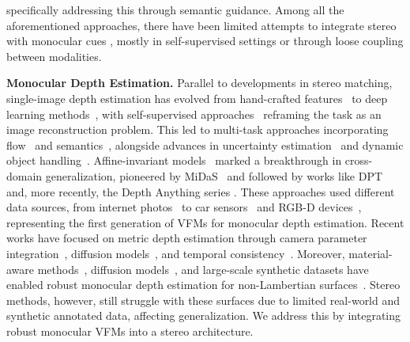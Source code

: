 \documentclass[10pt,twocolumn,letterpaper]{article}
\begin{document}
\cite{costanzino2023learning} specifically addressing this through semantic guidance. Among all the aforementioned approaches, there have been limited attempts to integrate stereo with monocular cues \cite{Chen_2021_ICCV, aleotti2020reversing, watson2020learning}, mostly in self-supervised settings or through loose coupling between modalities.

    \textbf{Monocular Depth Estimation.} Parallel to developments in stereo matching, single-image depth estimation has evolved from hand-crafted features~\cite{Saxena2008} to deep learning methods~\cite{chen2016single, eigen2014depth, laina2016deeper, Ramamonjisoa_2020_CVPR, wang2020cliffnet}, with self-supervised approaches~\cite{godard2017unsupervised, zhou2017unsupervised, mahjourian2018unsupervised, godard2019monodepth2, poggi2018learning, watson2019depthhints, zhao2022monovit}  reframing the task as an image reconstruction problem. This led to multi-task approaches incorporating flow~\cite{zou2018df, yin2018geonet, ranjan2019competitive, tosi2020distilled} and semantics~\cite{zama2019geometry, guizilini2020semantically}, alongside advances in uncertainty estimation~\cite{poggi2020uncertainty, hornauer2022gradient} and dynamic object handling~\cite{klingner2020self, sun2023dynamodepth, moon2023ground}.
    Affine-invariant models~\cite{Ranftl2022, Ranftl2021, Yin2020, Eftekhar2021} marked a breakthrough in cross-domain generalization, pioneered by MiDaS~\cite{Ranftl2022} and followed by works like DPT~\cite{Ranftl2021} and, more recently, the Depth Anything series \cite{depth_anything_v1}. These approaches used different data sources, from internet photos~\cite{li2018megadepth,Yin2020,Spencer2023c,Spencer2024} to car sensors~\cite{geiger2012we,menze2015object} and RGB-D devices~\cite{Silberman2012, Cho2021}, representing the first generation of VFMs for monocular depth estimation. Recent works have focused on metric depth estimation through camera parameter integration~\cite{Yin2023, hu2024metric3dv2,Guizilini2023}, diffusion models~\cite{Ji2023, Duan2023, Saxena2023, Saxena2023b, ke2023repurposing, fu2024geowizard}, and temporal consistency~\cite{shao2024learning, hu2024depthcrafter}.
    Moreover, material-aware methods~\cite{costanzino2023learning}, diffusion models~\cite{tosi2024diffusion}, and large-scale synthetic datasets have enabled robust monocular depth estimation for non-Lambertian surfaces~\cite{depth_anything_v2}. Stereo methods, however, still struggle with these surfaces due to limited real-world and synthetic annotated data, affecting generalization. We address this by integrating robust monocular VFMs into a stereo architecture.
\end{document}
